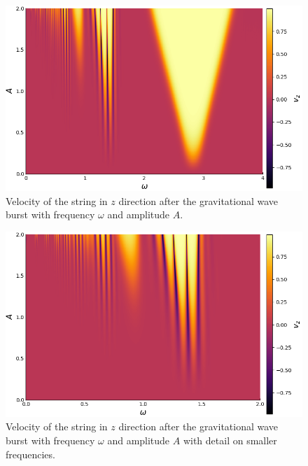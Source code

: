 \begin{figure}[p]
	\centering
	\includegraphics[width=1.0 \textwidth]{pictures/grav_velocity.png}
	\caption{Velocity of the string in $z$ direction after the gravitational wave burst with frequency $\omega$ and amplitude $A$.}
	\label{fig:grav_velocity}
\end{figure}


\begin{figure}[p]
	\centering
	\includegraphics[width=1.0 \textwidth]{pictures/grav_velocity_small.png}
	\caption{Velocity of the string in $z$ direction after the gravitational wave burst with frequency $\omega$ and amplitude $A$ with detail on smaller frequencies.}
	\label{fig:grav_velocity_small}
\end{figure}

